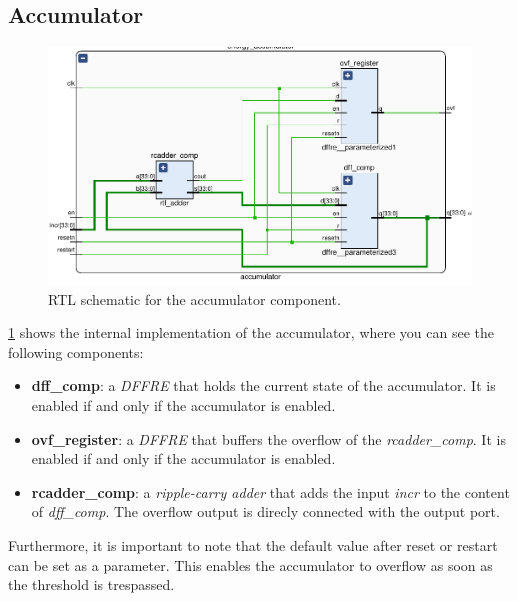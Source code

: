 \subsection{Accumulator}
\begin{figure}[]
  \centering
  \includegraphics[width=\textwidth]{figs/accumulator_schematic.pdf}
  \caption{RTL schematic for the accumulator component.}
  \label{fig:accumulator}
\end{figure}

\cref{fig:accumulator} shows the internal implementation of the accumulator, where you 
can see the following components:
\begin{itemize}
  \item \textbf{dff\_comp}: a \emph{DFFRE} that holds the current state of the 
    accumulator. It is enabled if and only if the accumulator is enabled.
  \item \textbf{ovf\_register}: a \emph{DFFRE} that buffers the overflow of the 
    \emph{rcadder\_comp}. It is enabled if and only if the accumulator is enabled.
  \item \textbf{rcadder\_comp}: a \emph{ripple-carry adder} that adds the input
    \emph{incr} to the content of \emph{dff\_comp}. The overflow output is 
    direcly connected with the output port.
\end{itemize}

Furthermore, it is important to note that the default value after reset 
or restart can be set as a parameter. 
This enables the accumulator to overflow as soon as the threshold is trespassed.

